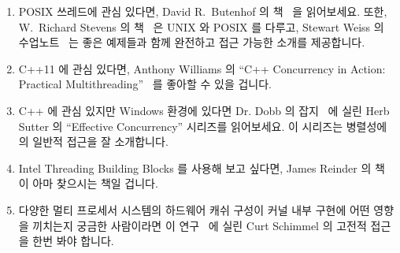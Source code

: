 \begin{enumerate}
\item	POSIX 쓰레드에 관심 있다면, David R.~Butenhof 의
	책~\cite{Butenhof1997pthreads} 을 읽어보세요.  또한, W.~Richard Stevens
	의 책~\cite{WRichardStevens1992} 은 UNIX 와 POSIX 를 다루고, Stewart
	Weiss 의 수업노트~\cite{StewartWeiss2013UNIX} 는 좋은 예제들과 함께
	완전하고 접근 가능한 소개를 제공합니다.


\item	C++11 에 관심 있다면, Anthony Williams 의 ``C++ Concurrency in Action:
	Practical Multithreading''~\cite{AnthonyWilliams2012} 를 좋아할 수 있을
	겁니다.


\item	C++ 에 관심 있지만 Windows 환경에 있다면 Dr. Dobb 의 잡지~\cite{HerbSutter2008EffectiveConcurrency} 에 실린 Herb Sutter 의 ``Effective Concurrency'' 시리즈를 읽어보세요.
	이 시리즈는 병렬성에의 일반적 접근을 잘 소개합니다.


\item	Intel Threading Building Blocks 를 사용해 보고 싶다면, James Reinder 의
	책~\cite{Reinders2007Textbook} 이 아마 찾으시는 책일 겁니다.


\item	다양한 멀티 프로세서 시스템의 하드웨어 캐쉬 구성이 커널 내부 구현에
	어떤 영향을 끼치는지 궁금한 사람이라면 이
	연구~\cite{Schimmel:1994:USM:175689} 에 실린 Curt Schimmel 의 고전적
	접근을 한번 봐야 합니다.


\end{enumerate}
